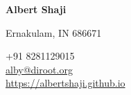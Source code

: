 \begin{multicols}{2}

{\LARGE\bfseries Albert Shaji}
\bigskip\bigskip %

Ernakulam, IN 686671
\smallskip

+91 8281129015\\
\href{mailto:alby@disroot.org}{alby@diroot.org}\\
\href{https://albertshaji.github.io/}{https://albertshaji.github.io}\\


\end{multicols}
